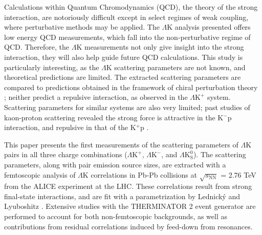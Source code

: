 \documentclass[ALICE,manyauthors]{cernphprep}
\newcommand{\LamK}{$\Lambda$K\xspace}
\newcommand{\LamKchP}{$\Lambda\mathrm{K^{+}}$\xspace}
\newcommand{\LamKchM}{$\Lambda\mathrm{K^{-}}$\xspace}
\newcommand{\LamKs}{$\Lambda\mathrm{K^{0}_{S}}$\xspace}
\begin{document}
Calculations within Quantum Chromodynamics (QCD), the theory of the strong interaction, are notoriously difficult except in select regimes of weak coupling, where perturbative methods may be applied. 
The \LamK analysis presented offers low energy QCD measurements, which fall into the non-perturbative regime of QCD.
Therefore, the \LamK measurements not only give insight into the strong interaction, they will also help guide future QCD calculations.
This study is particularly interesting, as the \LamK scattering parameters are not known, and theoretical predictions are limited.
The extracted scattering parameters are compared to predictions obtained in the framework of chiral perturbation theory \cite{Liu:2006xja,Mai:2009ce}; neither predict a repulsive interaction, as observed in the \LamKchP system.
Scattering parameters for similar systems are also very limited; past studies of kaon-proton scattering revealed the strong force is attractive in the K$^{-}$p interaction, and repulsive in that of the K$^{+}$p \cite{Humphrey:1962zz, Hadjimichef:2002xe, Ikeda:2012au}.

This paper presents the first measurements of the scattering parameters of \LamK pairs in all three charge combinations (\LamKchP, \LamKchM, and \LamKs).
The scattering parameters, along with pair emission source sizes, are extracted with a femtoscopic analysis of \LamK correlations in Pb-Pb collisions at $\sqrt{s_{\mathrm{NN}}}$ = 2.76 TeV from the ALICE experiment at the LHC.  
These correlations result from strong final-state interactions, and are fit with a parametrization by Lednick\'y and Lyuboshitz \cite{Lednicky:82}.  
Extensive studies with the THERMINATOR 2 event generator are performed to account for both non-femtoscopic backgrounds, as well as contributions from residual correlations induced by feed-down from resonances.
\end{document}
